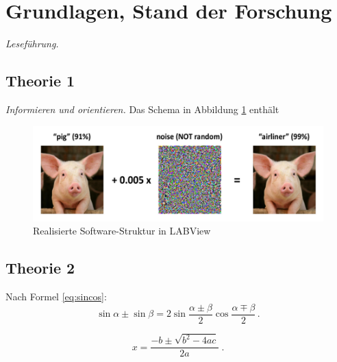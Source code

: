 \section{Grundlagen, Stand der Forschung}

\emph{Leseführung.} \lipsum[6-6]

\nocite{*}

\subsection{Theorie 1}

\emph{Informieren und orientieren.} Das Schema in Abbildung \ref{fig:software_struktur} enthält 
\lipsum[7-7]

\begin{figure}[H]
\begin{center}
\includegraphics[width=\linewidth]{01-images/01-titleimage.png}
\end{center}
\caption{Realisierte Software-Struktur in LABView \\
\cite{engstrom_discussion_2019}}
\label{fig:software_struktur}
\end{figure}

\lipsum[1]

\subsection{Theorie 2}

\lipsum[8]  Nach Formel \eqref{eq:sincos}:
\begin{equation}[H]
\sin \alpha \pm \sin \beta = 2\sin\frac{\alpha\pm\beta}{2}\cos\frac{\alpha\mp\beta}{2}\,. \label{eq:sincos}
\end{equation}

\lipsum[9]
\begin{equation}[H]
x = \frac{-b\pm\sqrt{b^2-4ac}}{2a}\;.
\end{equation}

\lipsum[9-10]
